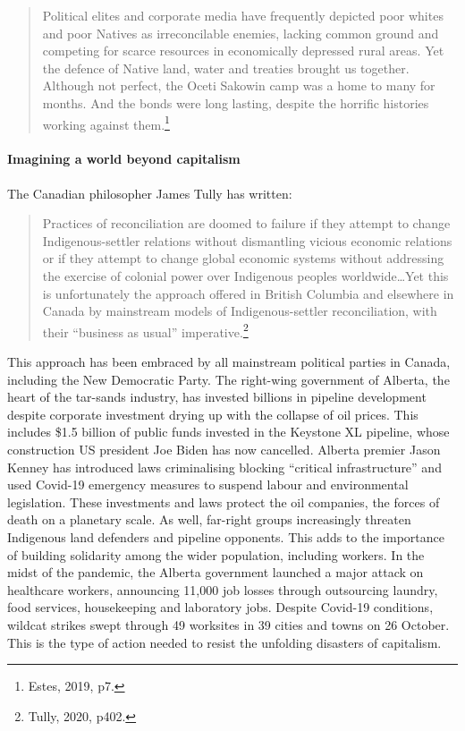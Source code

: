 \blockquote{Political elites and corporate media have frequently depicted poor whites and poor Natives as irreconcilable enemies, lacking common ground and competing for scarce resources in economically depressed rural areas. Yet the defence of Native land, water and treaties brought us together. Although not perfect, the Oceti Sakowin camp was a home to many for months. And the bonds were long lasting, despite the horrific histories working against them.\footnote{Estes, 2019, p7.}}

\paragraph{Imagining a world beyond capitalism}

The Canadian philosopher James Tully has written:

\blockquote{Practices of reconciliation are doomed to failure if they attempt to change Indigenous-settler relations without dismantling vicious economic relations or if they attempt to change global economic systems without addressing the exercise of colonial power over Indigenous peoples worldwide\ldots Yet this is unfortunately the approach offered in British Columbia and elsewhere in Canada by mainstream models of Indigenous-settler reconciliation, with their ``business as usual'' imperative.\footnote{Tully, 2020, p402.}}

This approach has been embraced by all mainstream political parties in Canada, including the New Democratic Party. The right-wing government of Alberta, the heart of the tar-sands industry, has invested billions in pipeline development despite corporate investment drying up with the collapse of oil prices. This includes \$1.5 billion of public funds invested in the Keystone XL pipeline, whose construction US president Joe Biden has now cancelled. Alberta premier Jason Kenney has introduced laws criminalising blocking ``critical infrastructure'' and used Covid-19 emergency measures to suspend labour and environmental legislation. These investments and laws protect the oil companies, the forces of death on a planetary scale. As well, far-right groups increasingly threaten Indigenous land defenders and pipeline opponents. This adds to the importance of building solidarity among the wider population, including workers. In the midst of the pandemic, the Alberta government launched a major attack on healthcare workers, announcing 11,000 job losses through outsourcing laundry, food services, housekeeping and laboratory jobs. Despite Covid-19 conditions, wildcat strikes swept through 49 worksites in 39 cities and towns on 26 October. This is the type of action needed to resist the unfolding disasters of capitalism.

